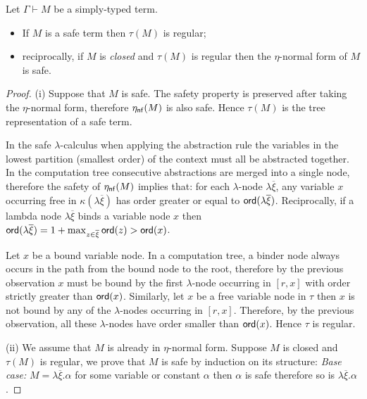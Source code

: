 \begin{lem}
\label{lem:regularity}
Let $\Gamma \vdash M$ be a simply-typed term.
\begin{itemize}
\item[(i)] If $M$ is a safe term then $\tau(M)$ is regular;
\item[(ii)] reciprocally, if $M$ is \emph{closed} and $\tau(M)$ is regular then the $\eta$-normal form of $M$ is safe.
\end{itemize}
\end{lem}
\begin{proof}
(i) Suppose that $M$ is safe. The safety property is preserved after taking the $\eta$-normal form, therefore
$\eta_{\sf nf}(M)$ is also safe. Hence $\tau(M)$ is the tree representation of a safe term.

In the safe $\lambda$-calculus when applying the abstraction rule the variables in the lowest partition (smallest order) of the context
must all be abstracted together.
In the computation tree consecutive abstractions are merged into a single node, therefore the safety of $\eta_{\sf nf}(M)$ implies
that: for each $\lambda$-node $\lambda \overline{\xi}$, any variable $x$ occurring free in $\kappa(\lambda \overline{\xi})$
has order greater or equal to ${\sf ord}(\lambda \overline{\xi})$. Reciprocally, if a lambda node $\lambda \overline{\xi}$
binds a variable node $x$ then ${\sf ord}(\lambda \overline{\xi}) = 1+\max_{z\in\overline{\xi}} {\sf ord}(z) > {\sf ord}(x)$.

Let $x$ be a bound variable node. In a computation tree, a binder node always occurs in the path from the bound node to the root,
therefore by the previous observation $x$ must be bound by the first $\lambda$-node occurring in $[r,x]$
with order strictly greater than ${\sf ord}(x)$.
Similarly, let $x$ be a free variable node in $\tau$ then $x$ is not bound by any of the $\lambda$-nodes occurring in $[r,x]$.
Therefore, by the previous observation, all these $\lambda$-nodes have order smaller than ${\sf ord}(x)$.
Hence $\tau$ is regular.

(ii) We assume that $M$ is already in $\eta$-normal form. Suppose $M$ is closed and $\tau(M)$ is regular,
we prove that $M$ is safe by induction on its structure:
\emph{Base case:} $M = \lambda \overline{\xi} . \alpha$ for some variable or constant $\alpha$ then $\alpha$ is safe therefore so is $\lambda \overline{\xi} . \alpha$.


\end{proof}
